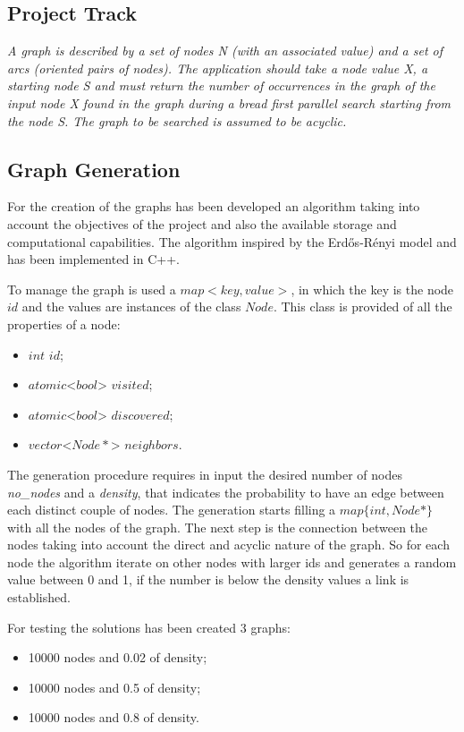 \subsection{Project Track}
\textit{A graph is described by a set of nodes N (with an associated value) and a set of arcs (oriented pairs of nodes). The application should take a node value X, a starting node S and must return the number of occurrences in the graph of the input node X found in the graph during a bread first parallel search starting from the node S. The graph to be searched is assumed to be acyclic.}

\subsection{Graph Generation}
\label{sec:graph}
For the creation of the graphs has been developed an algorithm taking into account the objectives of the project and also the available storage and computational capabilities. The algorithm inspired by the Erdős-Rényi model and has been implemented in C++.

To manage the graph is used a $map<key, value>$, in which the key is the node $id$ and the values are instances of the class $Node$. This class is provided of all the properties of a node:

\begin{itemize}
    \item $int$ $id$;
    \item $atomic$<$bool$> $visited$;
    \item $atomic$<$bool$> $discovered$;
    \item $vector$<$Node*$> $neighbors$.
\end{itemize}

The generation procedure requires in input the desired number of nodes \textit{no\_nodes} and a \textit{density}, that indicates the probability to have an edge between each distinct couple of nodes.  The generation starts filling a $map\{int, Node*\}$ with all the nodes of the graph. The next step is the connection between the nodes taking into account the direct and acyclic nature of the graph. So for each node the algorithm iterate on other nodes with larger ids and generates a random value between 0 and 1, if the number is below the density values a link is established. 

For testing the solutions has been created 3 graphs:
\begin{itemize}
    \item 10000 nodes and 0.02 of density;
    \item 10000 nodes and 0.5 of density;
    \item 10000 nodes and 0.8 of density.
\end{itemize}


